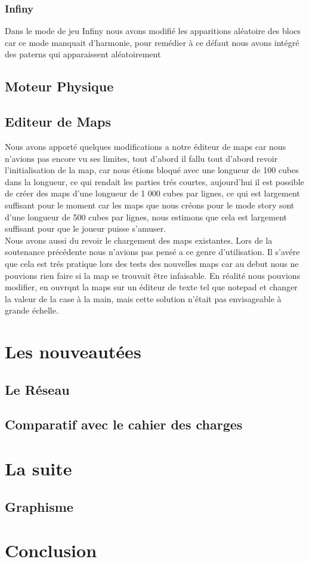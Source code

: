 \documentclass [11pt]{report}
\begin{document}
		\subsection{Infiny}
			Dans le mode de jeu Infiny nous avons modifi\'e les apparitions al\'eatoire des blocs car ce mode manquait d'harmonie, pour rem\'edier \`a ce d\'efaut nous avons int\'egr\'e des paterns qui apparaissent al\'eatoirement
	\section{Moteur Physique}
	\section{Editeur de Maps}
		Nous avons apport\'e quelques modifications a notre \'editeur de maps car nous n'avions pas encore vu ses limites, tout d'abord il fallu tout d'abord revoir l'initialisation de la map, car nous \'etions bloqu\'e avec une longueur de 100 cubes dans la longueur, ce qui rendait les parties tr\'es courtes, aujourd'hui il est possible de cr\'eer des maps d'une longueur de 1 000 cubes par lignes, ce qui est largement suffisant pour le moment car les maps que nous cr\'eons pour le mode story sont d'une longueur de 500 cubes par lignes, nous estimons que cela est largement suffisant pour que le joueur puisse s'amuser.\\
		\indent Nous avons aussi du revoir le chargement des maps existantes. Lors de la soutenance pr\'ec\'edente nous n'avions pas pens\'e a ce genre d'utilisation. Il s'av\'ere que cela est tr\'es pratique lors des tests des nouvelles maps car au debut nous ne pouvions rien faire si la map se trouvait \^etre infaisable. En r\'ealit\'e nous pouvions modifier, en ouvrqnt la maps sur un \'editeur de texte tel que notepad et changer la valeur de la case \`a la main, mais cette solution n'\'etait pas envisageable \`a grande \'echelle.
\chapter{Les nouveaut\'ees}
	\section{Le R\'eseau}
	\section{Comparatif avec le cahier des charges}
\chapter{La suite}
	\section{Graphisme}
\chapter*{Conclusion}
\end{document}
